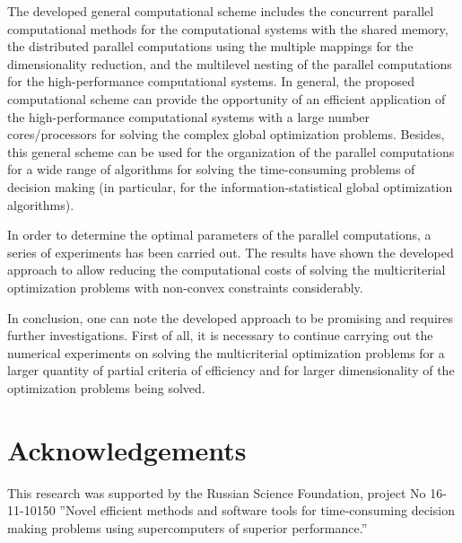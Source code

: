 \documentclass{svproc}
\begin{document}
The developed general computational scheme includes the concurrent parallel computational methods for the computational systems with the shared memory, the distributed parallel computations using the multiple mappings for the dimensionality reduction, and the multilevel nesting of the parallel computations for the high-performance computational systems. In general, the proposed computational scheme can provide the opportunity of an efficient application of the high-performance computational systems with a large number cores/processors for solving the complex global optimization problems. Besides, this general scheme can be used for the organization of the parallel computations for a wide range of algorithms for solving the time-consuming problems of decision making (in particular, for the information-statistical global optimization algorithms). 

In order to determine the optimal parameters of the parallel computations, a series of experiments has been carried out. The results have shown the developed approach to allow reducing the computational costs of solving the multicriterial optimization problems with non-convex constraints considerably.

In conclusion, one can note the developed approach to be promising and requires further investigations. First of all, it is necessary to continue carrying out the numerical experiments on solving the multicriterial optimization problems for a larger quantity of partial criteria of efficiency and for larger dimensionality of the optimization problems being solved. 

\section*{Acknowledgements}  
This research was supported by the Russian Science Foundation, project No 16-11-10150 ''Novel efficient methods and software tools for time-consuming decision making problems using supercomputers of superior performance.''
\end{document}
